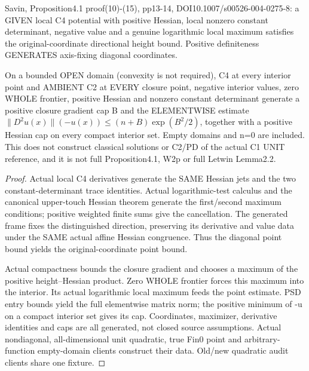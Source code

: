 \begin{lemma}
  \label{lem:classical-pogorelov}
  \leanok
  Savin, Proposition4.1 proof(10)-(15), pp13-14,
  DOI10.1007/s00526-004-0275-8: a GIVEN local C4 potential with positive Hessian,
  local nonzero constant determinant, negative value and a genuine logarithmic
  local maximum satisfies the original-coordinate directional height bound.
  Positive definiteness GENERATES axis-fixing diagonal coordinates.

  On a bounded OPEN domain (convexity is not required), C4 at every interior
  point and AMBIENT C2 at EVERY closure point, negative interior values,
  zero WHOLE frontier, positive Hessian and nonzero constant determinant
  generate a positive closure gradient cap B and the ELEMENTWISE estimate
  $\|D^2u(x)\|(-u(x))\le(n+B)\exp(B^2/2)$, together with a positive
  Hessian cap on every compact interior set. Empty domains and n=0 are included.
  This does not construct classical solutions or C2/PD of the actual C1 UNIT
  reference, and it is not full Proposition4.1, W2p or full Letwin Lemma2.2.
\end{lemma}
\begin{proof}
  \leanok
  Actual local C4 derivatives generate the SAME Hessian jets and the two
  constant-determinant trace identities. Actual logarithmic-test calculus
  and the canonical upper-touch Hessian theorem generate the first/second
  maximum conditions; positive weighted finite sums give the cancellation.
  The generated frame fixes the distinguished direction, preserving its
  derivative and value data under the SAME actual affine Hessian congruence.
  Thus the diagonal point bound yields the original-coordinate point bound.

  Actual compactness bounds the closure gradient and chooses a maximum of
  the positive height--Hessian product. Zero WHOLE frontier forces this
  maximum into the interior. Its actual logarithmic local maximum feeds the
  point estimate. PSD entry bounds yield the full elementwise matrix norm;
  the positive minimum of -u on a compact interior set gives its cap.
  Coordinates, maximizer, derivative identities and caps are all generated,
  not closed source assumptions. Actual nondiagonal, all-dimensional unit
  quadratic, true Fin0 point and arbitrary-function empty-domain clients
  construct their data. Old/new quadratic audit clients share one fixture.
\end{proof}


